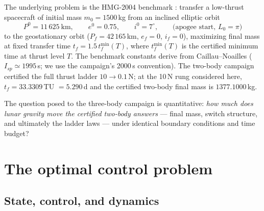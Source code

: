 \documentclass[11pt]{article}
\begin{document}
The underlying problem is the HMG-2004 benchmark \cite{HMG2004}: transfer a
low-thrust spacecraft of initial mass $m_0 = 1500$\,kg from an inclined
elliptic orbit
\[
P^0 = 11\,625~\text{km}, \qquad e^0 = 0.75, \qquad i^0 = 7^\circ,
\qquad \text{(apogee start, } L_0 = \pi\text{)}
\]
to the geostationary orbit ($P_f = 42\,165$\,km, $e_f = 0$, $i_f = 0$),
maximizing final mass at fixed transfer time $t_f = 1.5\,t_f^{\min}(T)$,
where $t_f^{\min}(T)$ is the certified minimum time at thrust level $T$.
The benchmark constants derive from Caillau--Noailles \cite{CN2001}
($I_{sp} \simeq 1995$\,s; we use the campaign's 2000\,s convention). The
two-body campaign certified the full thrust ladder $10 \to 0.1$\,N; at the
10\,N rung considered here, $t_f = 33.3309$\,TU $= 5.290$\,d and the
certified two-body final mass is $1377.1000$\,kg.

The question posed to the three-body campaign is quantitative: \emph{how
much does lunar gravity move the certified two-body answers} --- final
mass, switch structure, and ultimately the ladder laws --- under identical
boundary conditions and time budget?

\section{The optimal control problem}

\subsection{State, control, and dynamics}
\end{document}
